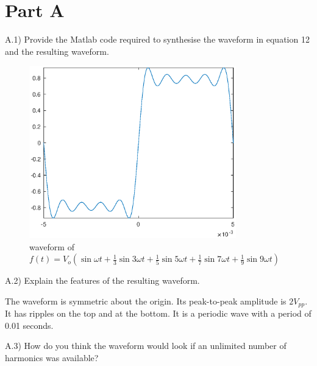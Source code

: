\section*{Part A}

\begin{tcolorbox}
  A.1) Provide the Matlab code required to synthesise the waveform in equation 12 and the resulting waveform.
\end{tcolorbox}



\begin{figure}[htbp]
  \centering
  \includegraphics[width=0.8\textwidth]{matlab/fig/A_r.eps}
  \caption{waveform of $f(t) = V_o(\sin\omega t+\frac{1}{3}\sin3\omega t+\frac{1}{5}\sin5\omega t+\frac{1}{7}\sin7\omega t+\frac{1}{9}\sin9\omega t)$}    
  \label{fig:A_r}
\end{figure}

\begin{tcolorbox}
  A.2) Explain the features of the resulting waveform.
\end{tcolorbox}

The waveform is symmetric about the origin. Its peak-to-peak amplitude is $2V_{pp}$. It has ripples on the top and at the bottom. It is a periodic wave with a period of 0.01 seconds.

\pagebreak

\begin{tcolorbox}
  A.3) How do you think the waveform would look if an unlimited number of harmonics was available?
\end{tcolorbox}

